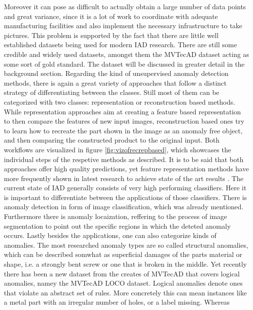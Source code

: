 Moreover it can pose as difficult to actually obtain a large number of data points and great variance, since it is a lot of work to 
coordinate with adequate manufacturing facilities and also implement the necessary infrastructure to take pictures. This problem is supported 
by the fact that there are little well established datasets being used for modern IAD research. There are still some credible and widely used 
datasets, amongst them the MVTecAD \cite{MVTEC_Bergmann_2021} dataset acting as some sort of gold standard. The dataset will be discussed in greater detail 
in the background section. Regarding the kind of unsupervised anomaly detection methods, there is again a great variety of approaches that follow a 
distinct strategy of differentiating between the classes. Still most of them can be categorized with two classes: representation 
or reconstruction based methods. While representation approaches aim at creating a feature based representation to then 
compare the features of new input images, reconstruction based ones try to learn how to recreate the part shown in the image as an anomaly 
free object, and then comparing the constructed product to the original input. Both workflows are visualized in figure \ref{fig:vizofrecrepbased}, which showcases 
the individual steps of the respetive methods as described. It is to be said that both approaches offer high quality predictions, yet 
feature representation methods have more frequently shown in latest research to achieve state of the art results \cite{liu2024deep}. %
\newline
The current state of IAD generally consists of very high performing classifiers. Here it is important to differentiate between the  
applications of those classifiers. There is anomaly detection in form of image classification, which was already mentioned. 
Furthermore there is anomaly locaization, reffering to the process of image segmentation to point out the specific regions in which 
the deteted anomaly occurs. Lastly besides the applications, one can also categorize kinds of anomalies. The most researched anomaly types 
are so called structural anomalies, which can be described somwhat as superficial damages of the parts material or shape, i.e. a strongly 
bent screw or one that is broken in the middle. Yet recently there has been a new dataset from the creates of MVTecAD that covers logical 
anomalies, namey the MVTecAD LOCO \cite{LOCODentsAndScratchesBergmann2022} dataset. Logical anomalies denote ones that violate an abstract 
set of rules. More concretely this can mean instances like a metal part with an irregular number of holes, or a label missing. Whereas 
